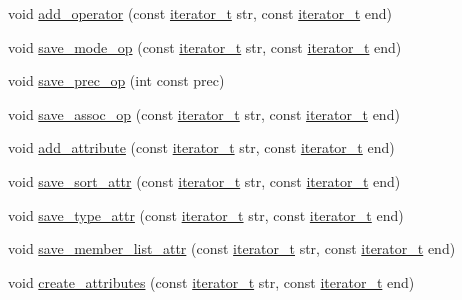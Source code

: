 \begin{CompactItemize}
\item 
void \hyperlink{namespacegenevalmag_5651e2842c6f77725d4c10f46655ead4}{add\_\-operator} (const \hyperlink{namespacegenevalmag_64946721fb97e58be670a468bf8e7056}{iterator\_\-t} str, const \hyperlink{namespacegenevalmag_64946721fb97e58be670a468bf8e7056}{iterator\_\-t} end)
\item 
void \hyperlink{namespacegenevalmag_6c04408088fac02746a5a14e9b10f304}{save\_\-mode\_\-op} (const \hyperlink{namespacegenevalmag_64946721fb97e58be670a468bf8e7056}{iterator\_\-t} str, const \hyperlink{namespacegenevalmag_64946721fb97e58be670a468bf8e7056}{iterator\_\-t} end)
\item 
void \hyperlink{namespacegenevalmag_76626584a4d067440fb992103081af8a}{save\_\-prec\_\-op} (int const prec)
\item 
void \hyperlink{namespacegenevalmag_3aa0e95a99ace1f802a226e24366f4fb}{save\_\-assoc\_\-op} (const \hyperlink{namespacegenevalmag_64946721fb97e58be670a468bf8e7056}{iterator\_\-t} str, const \hyperlink{namespacegenevalmag_64946721fb97e58be670a468bf8e7056}{iterator\_\-t} end)
\item 
void \hyperlink{namespacegenevalmag_92edf3022d197c1c9587126d1aea5c9f}{add\_\-attribute} (const \hyperlink{namespacegenevalmag_64946721fb97e58be670a468bf8e7056}{iterator\_\-t} str, const \hyperlink{namespacegenevalmag_64946721fb97e58be670a468bf8e7056}{iterator\_\-t} end)
\item 
void \hyperlink{namespacegenevalmag_48c1d5796cdb99233cf2dfe9d2224618}{save\_\-sort\_\-attr} (const \hyperlink{namespacegenevalmag_64946721fb97e58be670a468bf8e7056}{iterator\_\-t} str, const \hyperlink{namespacegenevalmag_64946721fb97e58be670a468bf8e7056}{iterator\_\-t} end)
\item 
void \hyperlink{namespacegenevalmag_9669d56acdb87bd7130c7da9d810b53a}{save\_\-type\_\-attr} (const \hyperlink{namespacegenevalmag_64946721fb97e58be670a468bf8e7056}{iterator\_\-t} str, const \hyperlink{namespacegenevalmag_64946721fb97e58be670a468bf8e7056}{iterator\_\-t} end)
\item 
void \hyperlink{namespacegenevalmag_8d8548aa085e3c04a2cb7abc9f5deacc}{save\_\-member\_\-list\_\-attr} (const \hyperlink{namespacegenevalmag_64946721fb97e58be670a468bf8e7056}{iterator\_\-t} str, const \hyperlink{namespacegenevalmag_64946721fb97e58be670a468bf8e7056}{iterator\_\-t} end)
\item 
void \hyperlink{namespacegenevalmag_640285acc8edfe19e082795784dbbd51}{create\_\-attributes} (const \hyperlink{namespacegenevalmag_64946721fb97e58be670a468bf8e7056}{iterator\_\-t} str, const \hyperlink{namespacegenevalmag_64946721fb97e58be670a468bf8e7056}{iterator\_\-t} end)

\end{CompactItemize}
